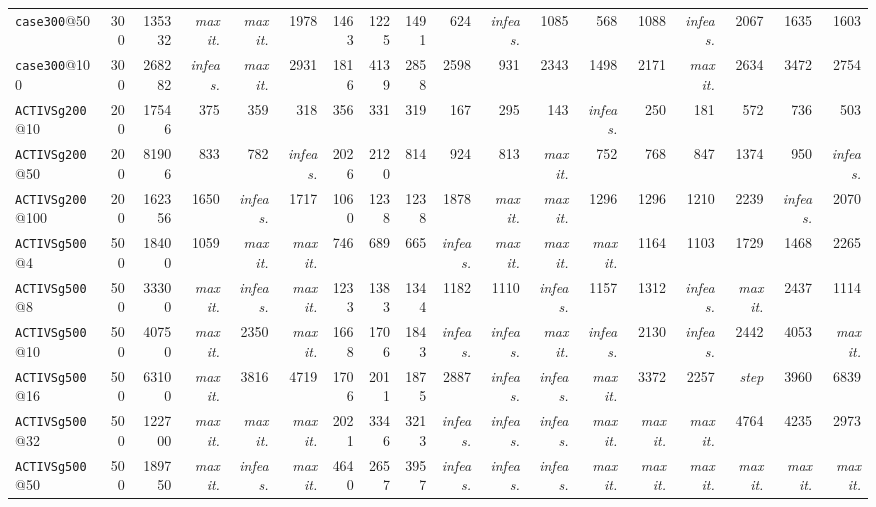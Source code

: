 {\begin{longtable}{lrrrrrrrrrrrrrrrrr}
\texttt{case300}@50 & 300 & 135332 & \textit{max it.} & \textit{max it.} & 1978 & 1463 & 1225 & 1491 & 624 & \textit{infeas.} & 1085 & 568 & 1088 & \textit{infeas.} & 2067 & 1635 & 1603 \\
\texttt{case300}@100 & 300 & 268282 & \textit{infeas.} & \textit{max it.} & 2931 & 1816 & 4139 & 2858 & 2598 & 931 & 2343 & 1498 & 2171 & \textit{max it.} & 2634 & 3472 & 2754 \\
\texttt{ACTIVSg200}@10 & 200 & 17546 & 375 & 359 & 318 & 356 & 331 & 319 & 167 & 295 & 143 & \textit{infeas.} & 250 & 181 & 572 & 736 & 503 \\
\texttt{ACTIVSg200}@50 & 200 & 81906 & 833 & 782 & \textit{infeas.} & 2026 & 2120 & 814 & 924 & 813 & \textit{max it.} & 752 & 768 & 847 & 1374 & 950 & \textit{infeas.} \\
\texttt{ACTIVSg200}@100 & 200 & 162356 & 1650 & \textit{infeas.} & 1717 & 1060 & 1238 & 1238 & 1878 & \textit{max it.} & \textit{max it.} & 1296 & 1296 & 1210 & 2239 & \textit{infeas.} & 2070 \\
\texttt{ACTIVSg500}@4 & 500 & 18400 & 1059 & \textit{max it.} & \textit{max it.} & 746 & 689 & 665 & \textit{infeas.} & \textit{max it.} & \textit{max it.} & \textit{max it.} & 1164 & 1103 & 1729 & 1468 & 2265 \\
\texttt{ACTIVSg500}@8 & 500 & 33300 & \textit{max it.} & \textit{infeas.} & \textit{max it.} & 1233 & 1383 & 1344 & 1182 & 1110 & \textit{infeas.} & 1157 & 1312 & \textit{infeas.} & \textit{max it.} & 2437 & 1114 \\
\texttt{ACTIVSg500}@10 & 500 & 40750 & \textit{max it.} & 2350 & \textit{max it.} & 1668 & 1706 & 1843 & \textit{infeas.} & \textit{infeas.} & \textit{max it.} & \textit{infeas.} & 2130 & \textit{infeas.} & 2442 & 4053 & \textit{max it.} \\
\texttt{ACTIVSg500}@16 & 500 & 63100 & \textit{max it.} & 3816 & 4719 & 1706 & 2011 & 1875 & 2887 & \textit{infeas.} & \textit{infeas.} & \textit{max it.} & 3372 & 2257 & \textit{step} & 3960 & 6839 \\
\texttt{ACTIVSg500}@32 & 500 & 122700 & \textit{max it.} & \textit{max it.} & \textit{max it.} & 2021 & 3346 & 3213 & \textit{infeas.} & \textit{infeas.} & \textit{infeas.} & \textit{max it.} & \textit{max it.} & \textit{max it.} & 4764 & 4235 & 2973 \\
\texttt{ACTIVSg500}@50 & 500 & 189750 & \textit{max it.} & \textit{infeas.} & \textit{max it.} & 4640 & 2657 & 3957 & \textit{infeas.} & \textit{infeas.} & \textit{infeas.} & \textit{max it.} & \textit{max it.} & \textit{max it.} & \textit{max it.} & \textit{max it.} & \textit{max it.} \\

\end{longtable}}
